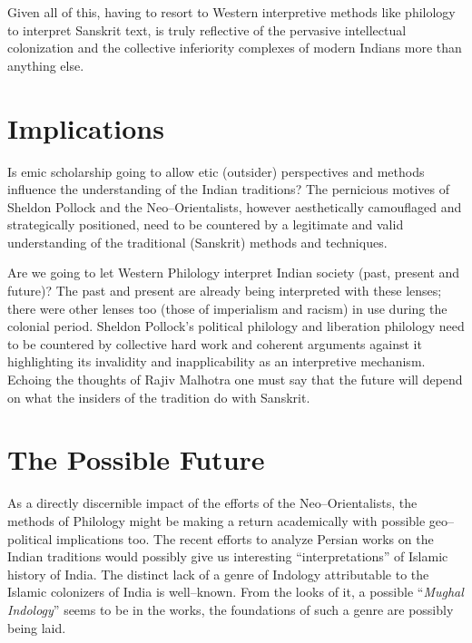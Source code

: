Given all of this, having to resort to Western interpretive methods like philology to interpret Sanskrit text, is truly reflective of the pervasive intellectual colonization and the collective inferiority complexes of modern Indians more than anything else.


\section*{Implications}

\vskip -7pt

Is emic scholarship going to allow etic (outsider) perspectives and methods influence the understanding of the Indian traditions? The pernicious motives of Sheldon Pollock and the Neo–Orientalists, however aesthetically camouflaged and strategically positioned, need to be countered by a legitimate and valid understanding of the traditional (Sanskrit) methods and techniques.

Are we going to let Western Philology interpret Indian society (past, present and future)? The past and present are already being interpreted with these lenses; there were other lenses too (those of imperialism and racism) in use during the colonial period. Sheldon Pollock’s political philology and liberation philology need to be countered by collective hard work and coherent arguments against it highlighting its invalidity and inapplicability as an interpretive mechanism. Echoing the thoughts of Rajiv Malhotra one must say that the future will depend on what the insiders of the tradition do with Sanskrit.

\vskip -6pt


\section*{The Possible Future}

\vskip -6pt

As a directly discernible impact of the efforts of the Neo–Orientalists, the methods of Philology might be making a return academically with possible geo–political implications too. The recent efforts to analyze Persian works on the Indian traditions would possibly give us interesting “interpretations” of Islamic history of India. The distinct lack of a genre of Indology attributable to the Islamic colonizers of India is well–known. From the looks of it, a possible “\textit{Mughal Indology}” seems to be in the works, the foundations of such a genre are possibly being laid.

